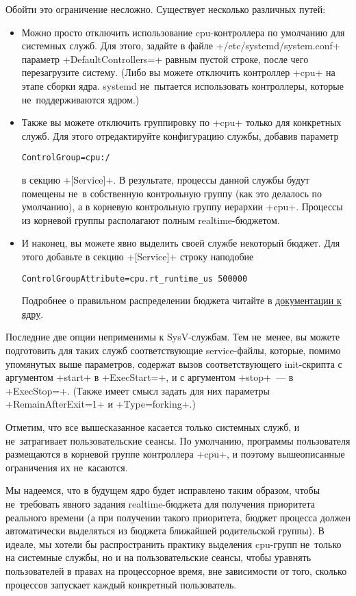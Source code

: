 \documentclass[10pt,oneside,a4paper]{article}
\begin{document}
Обойти это ограничение несложно. Существует несколько различных путей:
\begin{itemize}
	\item Можно просто отключить использование cpu-контроллера по умолчанию 
		для системных служб. Для этого, задайте в файле
		+/etc/systemd/system.conf+ параметр +DefaultControllers=+ равным
		пустой строке, после чего перезагрузите систему. (Либо вы
		можете отключить контроллер +cpu+ на этапе сборки ядра. systemd
		не~пытается использовать контроллеры, которые не~поддерживаются
		ядром.)
	\item Также вы можете отключить группировку по +cpu+ только для
		конкретных служб. Для этого отредактируйте конфигурацию службы,
		добавив параметр 
\begin{Verbatim}
ControlGroup=cpu:/
\end{Verbatim}
		в секцию +[Service]+. В
		результате, процессы данной службы будут помещены не~в
		собственную контрольную группу (как это делалось по умолчанию),
		а в корневую контрольную группу иерархии +cpu+. Процессы из
		корневой группы располагают полным realtime-бюджетом.
	\item И наконец, вы можете явно выделить своей службе некоторый бюджет.
		Для этого добавьте в секцию +[Service]+ строку наподобие
\begin{Verbatim}
ControlGroupAttribute=cpu.rt_runtime_us 500000
\end{Verbatim}  
		Подробнее о правильном распределении бюджета читайте в
		\href{http://www.kernel.org/doc/Documentation/scheduler/sched-rt-group.txt}%
		{документации к ядру}.
\end{itemize}

Последние две опции неприменимы к SysV-службам. Тем не~менее, вы можете
подготовить для таких служб соответствующие service-файлы, которые, помимо
упомянутых выше параметров, содержат вызов соответствующего init-скрипта с
аргументом +start+ в +ExecStart=+, и с аргументом +stop+~--- в +ExecStop=+.
(Также имеет смысл задать для них параметры +RemainAfterExit=1+ и
+Type=forking+.)

Отметим, что все вышесказанное касается только системных служб, и не~затрагивает
пользовательские сеансы. По умолчанию, программы пользователя размещаются в
корневой группе контроллера +cpu+, и поэтому вышеописанные ограничения их
не~касаются.

Мы надеемся, что в будущем ядро будет исправлено таким образом, чтобы
не~требовать явного задания realtime-бюджета для получения приоритета реального
времени (а при получении такого приоритета, бюджет процесса должен автоматически
выделяться из бюджета ближайшей родительской группы). В идеале, мы хотели бы
распространить практику выделения cpu-групп не~только на системные службы, но и
на пользовательские сеансы, чтобы уравнять пользователей в правах на
процессорное время, вне зависимости от того, сколько процессов запускает каждый
конкретный пользователь.
\end{document}
